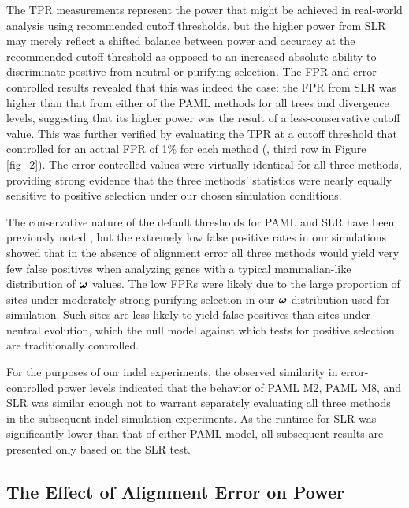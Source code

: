 \documentclass{mbe}
\begin{document}
The TPR measurements represent the power that might be achieved in
real-world analysis using recommended cutoff thresholds, but the
higher power from SLR may merely reflect a shifted balance between
power and accuracy at the recommended cutoff threshold as opposed to
an increased absolute ability to discriminate positive from neutral or
purifying selection. The FPR and error-controlled \tpr results
revealed that this was indeed the case: the FPR from SLR was higher
than that from either of the PAML methods for all trees and divergence
levels, suggesting that its higher power was the result of a
less-conservative cutoff value. This was further verified by
evaluating the TPR at a cutoff threshold that controlled for an actual
FPR of 1\% for each method (\tpr{}, third row in Figure
\ref{fig_2}). The error-controlled \tpr values were virtually
identical for all three methods, providing strong evidence that the
three methods' \sw statistics were nearly equally sensitive to
positive selection under our chosen simulation conditions.

The conservative nature of the default thresholds for PAML and SLR
have been previously noted
\citep{Anisimova2002Accuracy,Yang2005Bayes,Massingham2005Detecting},
but the extremely low false positive rates in our simulations showed
that in the absence of alignment error all three methods would yield
very few false positives when analyzing genes with a typical
mammalian-like distribution of $\bm{\omega}$ values. The low FPRs were likely
due to the large proportion of sites under moderately strong purifying
selection in our $\bm{\omega}$ distribution used for simulation. Such sites
are less likely to yield false positives than sites under neutral
evolution, which the null model against which tests for positive
selection are traditionally controlled.

For the purposes of our indel experiments, the observed similarity in
error-controlled power levels indicated that the behavior of PAML M2,
PAML M8, and SLR was similar enough not to warrant separately
evaluating all three methods in the subsequent indel simulation
experiments. As the runtime for SLR was significantly lower than that
of either PAML model, all subsequent results are presented only based
on the SLR test.

\subsection*{The Effect of Alignment Error on \Sw Power}
\end{document}
